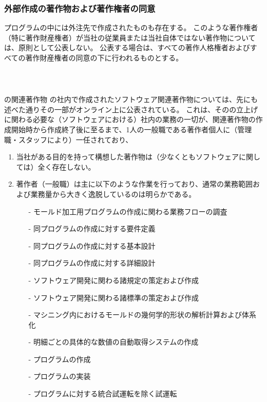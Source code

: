 \subsubsection{外部作成の著作物および著作権者の同意\label{subsec:copyrightsSubcontractor}}
プログラムの中には外注先で作成されたものも存在する。
このような著作権者（特に著作財産権者）が当社の従業員または当社自体ではない著作物については、原則として公表しない。
公表する場合は、すべての著作人格権者およびすべての著作財産権者の同意の下に行われるものとする。



\clearpage
~\vfill
\begin{Column}{\DMname の関連著作物}
\DMname の社内で作成されたソフトウェア関連著作物については、先にも述べた通りその一部がオンライン上に公表されている。
これは、その\DMname の立上げに関わる必要な（ソフトウェアにおける）社内の業務の一切が、関連著作物の作成開始時から作成終了後に至るまで、1人の一般職である著作者個人に（管理職・スタッフにより）一任されており、
\begin{enumerate}[label=\Roman*]
\item 当社がある目的を持って構想した著作物は（少なくともソフトウェアに関しては）全く存在しない。
\item
著作者（一般職）は主に以下のような作業を行っており、通常の業務範囲および業務量から大きく逸脱しているのは明らかである。
  \begin{enumerate}
  \item[-] モールド加工用プログラムの作成に関わる業務フローの調査
  \item[-] 同プログラムの作成に対する要件定義
  \item[-] 同プログラムの作成に対する基本設計
  \item[-] 同プログラムの作成に対する詳細設計
  \item[-] ソフトウェア開発に関わる諸規定の策定および作成
  \item[-] ソフトウェア開発に関わる諸標準の策定および作成
  \item[-] マシニング内におけるモールドの幾何学的形状の解析計算および体系化
  \item[-] 明細ごとの具体的な数値の自動取得システムの作成
  \item[-] プログラムの作成
  \item[-] プログラムの実装
  \item[-] プログラムに対する統合試運転を除く試運転

\end{enumerate}
\end{enumerate}
\end{Column}
